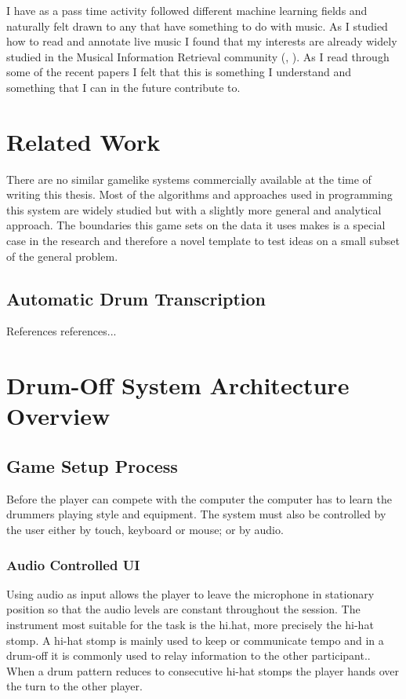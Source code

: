 \documentclass[10pt]{article}
\begin{document}
I have as a pass time activity followed different machine learning fields and naturally felt drawn to any that have something to do with music. As I studied how to read and annotate live music I found that my interests are already widely studied in the Musical Information Retrieval community (\cite{ismir}, \cite{mirex}). As I read through some of the recent papers I felt that this is something I understand and something that I can in the future contribute to.
\section{Related Work} 
There are no similar gamelike systems commercially available at the time of writing this thesis. Most of the algorithms and approaches used in programming this system are widely studied but with a slightly more general and analytical approach. The boundaries this game sets on the data it uses makes is a special case in the research and therefore a novel template to test ideas on a small subset of the general problem.
\subsection{Automatic Drum Transcription}
References references...
\section{Drum-Off System Architecture Overview}
\subsection{Game Setup Process}
Before the player can compete with the computer the computer has to learn the drummers playing style and equipment. The system must also be controlled by the user either by touch, keyboard or mouse; or by audio. 
\subsubsection{Audio Controlled UI}
Using audio as input allows the player to leave the microphone in stationary position so that the audio levels are constant throughout the session. The instrument most suitable for the task is the hi.hat, more precisely the hi-hat stomp. A hi-hat stomp is mainly used to keep or communicate tempo and in a drum-off it is commonly used to relay information to the other participant.. When a drum pattern reduces to consecutive hi-hat stomps the player hands over the turn to the other player.
\end{document}
